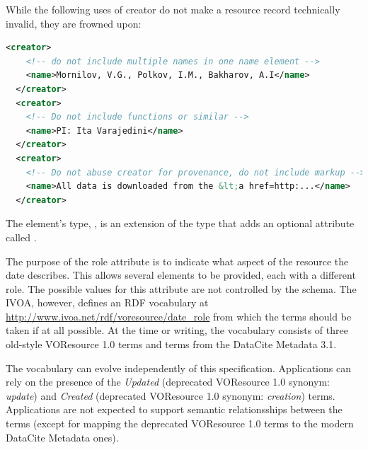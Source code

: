 \documentclass[11pt,a4paper]{ivoa}
\begin{document}
While the following uses of creator do not make a resource record
technically invalid, they are frowned upon:

\begin{lstlisting}[language=XML,basicstyle=\footnotesize]
  <creator>
    <!-- do not include multiple names in one name element -->
    <name>Mornilov, V.G., Polkov, I.M., Bakharov, A.I</name>
  </creator>
  <creator>
    <!-- Do not include functions or similar -->
    <name>PI: Ita Varajedini</name>
  </creator>
  <creator>
    <!-- Do not abuse creator for provenance, do not include markup -->
    <name>All data is downloaded from the &lt;a href=http:...</name>
  </creator>
\end{lstlisting}

The  element's type, , is an extension of the
 type that adds an
optional attribute called .  

The purpose of the role attribute is to indicate what aspect of the
resource the date describes. This allows several  elements to be
provided, each with a different role. The possible values for this
attribute are not controlled by the schema.  The IVOA, however, defines
an RDF vocabulary at
\url{http://www.ivoa.net/rdf/voresource/date_role} from
which the  terms should be taken if at all possible.  At the
time or writing, the vocabulary consists of three old-style VOResource
1.0 terms and terms from the DataCite Metadata 3.1.

The vocabulary can evolve independently of this specification.
Applications can rely on the presence of the \textsl{Updated}
(deprecated VOResource 1.0 synonym: \textsl{update}) and
\textsl{Created} (deprecated VOResource 1.0 synonym: \textsl{creation})
terms.  Applications are not expected to support semantic relationsships
between the terms (except for mapping the deprecated VOResource 1.0
terms to the modern DataCite Metadata ones).
\end{document}
